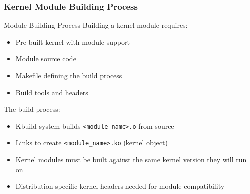 \raggedcolumns
\columnbreak

\subsubsection{Kernel Module Building Process}

\begin{definition}{Module Building Process}
    Building a kernel module requires:
    \begin{itemize}
        \item Pre-built kernel with module support
        \item Module source code
        \item Makefile defining the build process
        \item Build tools and headers
    \end{itemize}
    
    The build process:
    \begin{itemize}
        \item Kbuild system builds \texttt{<module\_name>.o} from source
        \item Links to create \texttt{<module\_name>.ko} (kernel object)
        \item Kernel modules must be built against the same kernel version they will run on
        \item Distribution-specific kernel headers needed for module compatibility
    \end{itemize}
\end{definition}

